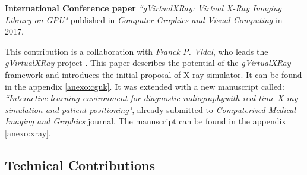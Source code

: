 
\textbf{International Conference paper }\emph{``gVirtualXRay: Virtual X-Ray Imaging Library on GPU"}\cite{sujar:hal} published in \emph{Computer Graphics and Visual Computing} in 2017.

This contribution is a collaboration with \emph{Franck P. Vidal}, who leads the \emph{gVirtualXRay} project \cite{gVirtualXRay}. This paper describes the potential of the  \emph{gVirtualXRay} framework and introduces the initial proposal of X-ray simulator. It can be found in the appendix \ref{anexo:cguk}. It was extended with a new manuscript called: %
\emph{``Interactive learning environment for diagnostic radiographywith real-time X-ray simulation and patient positioning"}, already submitted to \emph{Computerized Medical Imaging and Graphics} journal. The manuscript can be found in the appendix \ref{anexo:xray}.




\subsection{Technical Contributions}
\label{conclu:tecnica}

